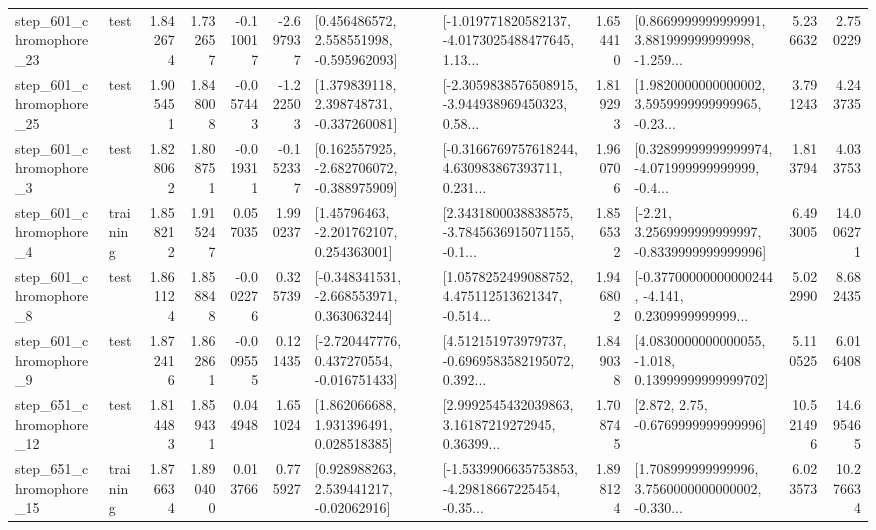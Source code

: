 \begin{tabular}{llrrrrllrlrr}
  step\_601\_chromophore\_23 &      test &      1.842674 &    1.732657 &     -0.110017 & -2.697937 &    [0.456486572, 2.558551998, -0.595962093] &  [-1.019771820582137, -4.0173025488477645, 1.13... &       1.654410 &  [0.8669999999999991, 3.881999999999998, -1.259... &            5.236632 &          2.750229 \\
  step\_601\_chromophore\_25 &      test &      1.905451 &    1.848008 &     -0.057443 & -1.222503 &    [1.379839118, 2.398748731, -0.337260081] &  [-2.3059838576508915, -3.944938969450323, 0.58... &       1.819293 &  [1.9820000000000002, 3.5959999999999965, -0.23... &            3.791243 &          4.243735 \\
   step\_601\_chromophore\_3 &      test &      1.828062 &    1.808751 &     -0.019311 & -0.152337 &   [0.162557925, -2.682706072, -0.388975909] &  [-0.3166769757618244, 4.630983867393711, 0.231... &       1.960706 &  [0.32899999999999974, -4.071999999999999, -0.4... &            1.813794 &          4.033753 \\
   step\_601\_chromophore\_4 &  training &      1.858212 &    1.915247 &      0.057035 &  1.990237 &     [1.45796463, -2.201762107, 0.254363001] &  [2.3431800038838575, -3.7845636915071155, -0.1... &       1.856532 &   [-2.21, 3.2569999999999997, -0.8339999999999996] &            6.493005 &         14.006271 \\
   step\_601\_chromophore\_8 &      test &      1.861124 &    1.858848 &     -0.002276 &  0.325739 &   [-0.348341531, -2.668553971, 0.363063244] &  [1.0578252499088752, 4.475112513621347, -0.514... &       1.946802 &  [-0.37700000000000244, -4.141, 0.2309999999999... &            5.022990 &          8.682435 \\
   step\_601\_chromophore\_9 &      test &      1.872416 &    1.862861 &     -0.009555 &  0.121435 &   [-2.720447776, 0.437270554, -0.016751433] &  [4.512151973979737, -0.6969583582195072, 0.392... &       1.849038 &  [4.0830000000000055, -1.018, 0.13999999999999702] &            5.110525 &          6.016408 \\
  step\_651\_chromophore\_12 &      test &      1.814483 &    1.859431 &      0.044948 &  1.651024 &     [1.862066688, 1.931396491, 0.028518385] &  [2.9992545432039863, 3.16187219272945, 0.36399... &       1.708745 &                 [2.872, 2.75, -0.6769999999999996] &           10.521496 &         14.695465 \\
  step\_651\_chromophore\_15 &  training &      1.876634 &    1.890400 &      0.013766 &  0.775927 &     [0.928988263, 2.539441217, -0.02062916] &  [-1.5339906635753853, -4.29818667225454, -0.35... &       1.898124 &  [1.708999999999996, 3.7560000000000002, -0.330... &            6.023573 &         10.276634 \\

\end{tabular}

